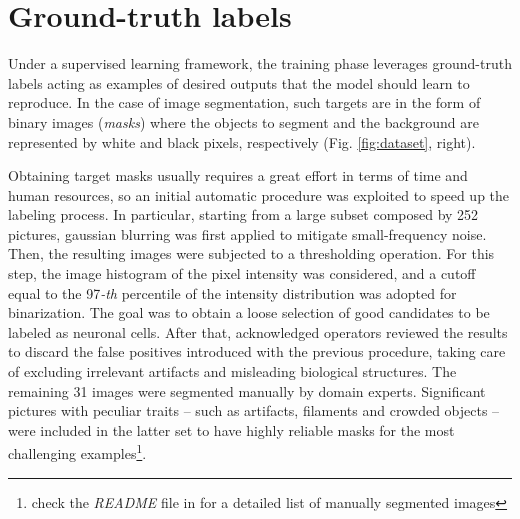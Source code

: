 \section{Ground-truth labels}
Under a supervised learning framework, the training phase leverages ground-truth labels acting as examples of desired outputs that the model should learn to reproduce. 
In the case of image segmentation, such targets are in the form of binary images (\textit{masks}) where the objects to segment and the background are represented by white and black pixels, respectively (Fig. \ref{fig:dataset}, right).

Obtaining target masks usually requires a great effort in terms of time and human resources, so an initial automatic procedure was exploited to speed up the labeling process. 
In particular, starting from a large subset composed by 252 pictures, gaussian blurring was first applied to mitigate small-frequency noise. 
Then, the resulting images were subjected to a thresholding operation.
For this step, the image histogram of the pixel intensity was considered, and a cutoff equal to the 97\emph{-th} percentile of the intensity distribution was adopted for binarization. 
The goal was to obtain a loose selection of good candidates to be labeled as neuronal cells. 
After that, acknowledged operators reviewed the results to discard the false positives introduced with the previous procedure, taking care of excluding irrelevant artifacts and misleading biological structures.
The remaining 31 images were segmented manually by domain experts. Significant pictures with peculiar traits -- such as artifacts, filaments and crowded objects -- were included in the latter set to have highly reliable masks for the most challenging examples\footnote{check the \emph{README} file in  for a detailed list of manually segmented images}. 



